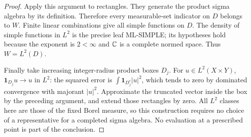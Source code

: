 \documentclass[11pt,a4paper]{article}
\theoremstyle{remark}\newtheorem{remark}[theorem]{Remark}
\begin{document}
\begin{proof}
Apply this argument to rectangles. They generate the product sigma algebra by its definition. Therefore every measurable-set indicator on $D$ belongs to $W$. Finite linear combinations give all simple functions on $D$. The density of simple functions in $L^2$ is the precise leaf ML-SIMPLE; its hypotheses hold because the exponent is $2<\infty$ and $\mathbb C$ is a complete normed space. Thus $W=L^2(D)$.

Finally take increasing integer-radius product boxes $D_j$. For $u\in L^2(X\times Y)$, $\mathbf1_{D_j}u\to u$ in $L^2$: the squared error is $\int\mathbf1_{D_j^c}|u|^2$, which tends to zero by dominated convergence with majorant $|u|^2$. Approximate the truncated vector inside the box by the preceding argument, and extend those rectangles by zero. All $L^2$ classes here are those of the fixed Borel measure, so this construction requires no choice of a representative for a completed sigma algebra. No evaluation at a prescribed point is part of the conclusion.
\end{proof}
\end{document}
